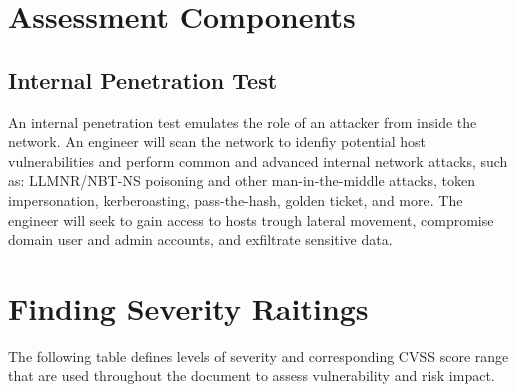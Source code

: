 \documentclass[a4paper]{article} %
\newcommand{\clientName}{Hack The Box 2}
\newcommand{\theAuthor}{Elliot Alderson}
\newcommand{\startDatePentest}{24 de Marzo del 2024}
\newcommand{\finalDatePentest}{24 de Marzo del 2024}
\begin{document}



    \section{Assessment Components}
    \subsection{Internal Penetration Test}
    An internal penetration test emulates the role of an attacker from inside the network. An engineer will scan the network to idenfiy potential host vulnerabilities and perform common and advanced internal network attacks, such as: LLMNR/NBT-NS poisoning and other man-in-the-middle attacks, token impersonation, kerberoasting, pass-the-hash, golden ticket, and more. The engineer will seek to gain access to hosts trough lateral movement, compromise domain user and admin accounts, and exfiltrate sensitive data.

    \clearpage
    \section{Finding Severity Raitings}
    The following table defines levels of severity and corresponding CVSS score range that are used throughout the document to assess vulnerability and risk impact.
    \vspace{0.3cm}
\end{document}
